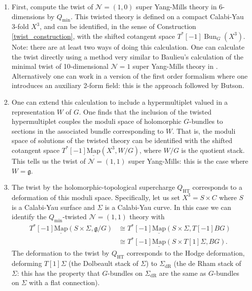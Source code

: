 \documentclass[11pt, oneside, reqno]{amsart}
\theoremstyle{definition} \newtheorem{definition}{Definition}[section]
\theoremstyle{definition} \newtheorem{remark}[definition]{Remark}
\theoremstyle{definition} \newtheorem{remarks}[definition]{Remarks}
\theoremstyle{definition} \newtheorem{question}[definition]{Question}
\theoremstyle{definition} \newtheorem*{note}{Note}
\theoremstyle{definition} \newtheorem{example}[definition]{Example}
\theoremstyle{definition} \newtheorem{examples}[definition]{Examples}
\renewcommand{\gg}{\mathfrak{g}}
\newcommand{\mr}[1]{\mathrm{#1}}
\newcommand{\mc}[1]{\mathcal{#1}}
\newcommand{\ul}[1]{\underline{#1}}
\newcommand{\iso}{\cong}
\DeclareMathOperator{\bun}{Bun}
\newcommand{\map}{\ul{\mr{Map}}}
\newcommand{\HT}{\mr{HT}}
\begin{document}
\begin{enumerate}
 \item First, compute the twist of $\mc N=(1,0)$ super Yang-Mills theory in 6-dimensions by $Q_{\mr{min}}$.  This twisted theory is defined on a compact Calabi-Yau 3-fold $X^3$, and can be identified, in the sense of Construction \ref{twist_construction}, with the shifted cotangent space $T^*[-1]\bun_G(X^3)$.  Note: there are at least two ways of doing this calculation.  One can calculate the twist directly using a method very similar to Baulieu's calculation of the minimal twist of 10-dimensional $\mc N=1$ super Yang-Mills theory in \cite{Baulieu}.  Alternatively one can work in a version of the first order formalism where one introduces an auxiliary 2-form field: this is the approach followed by Butson. 
 
 \item One can extend this calculation to include a hypermultiplet valued in a representation $W$ of $G$.  One finds that the inclusion of the twisted hypermultiplet couples the moduli space of holomorphic $G$-bundles to sections in the associated bundle corresponding to $W$.  That is, the moduli space of solutions of the twisted theory can be identified with the shifted cotangent space $T^*[-1]\map(X^3, W/G)$, where $W/G$ is the quotient stack.  This tells us the twist of $\mc N=(1,1)$ super Yang-Mills: this is the case where $W = \gg$.
 
 \item The twist by the holomorphic-topological supercharge $Q_{\mr{HT}}$ corresponds to a deformation of this moduli space.  Specifically, let us set $X^3 = S \times C$ where $S$ is a Calabi-Yau surface and $\Sigma$ is a Calabi-Yau curve.  In this case we can identify the $Q_{\mr{min}}$-twisted $\mc N=(1,1)$ theory with
 \begin{align*}
 T^*[-1]\map(S \times \Sigma, \gg/G) &\iso T^*[-1]\map(S \times \Sigma, T[-1]BG) \\
 &\iso T^*[-1]\map(S \times T[1]\Sigma, BG).  
 \end{align*}
 The deformation to the twist by $Q_\HT$ corresponds to the Hodge deformation, deforming $T[1]\Sigma$ (the Dolbeault stack of $\Sigma$) to $\Sigma_{\mr{dR}}$ (the de Rham stack of $\Sigma$: this has the property that $G$-bundles on $\Sigma_{\mr{dR}}$ are the same as $G$-bundles on $\Sigma$ with a flat connection).  
 

\end{enumerate}
\end{document}
